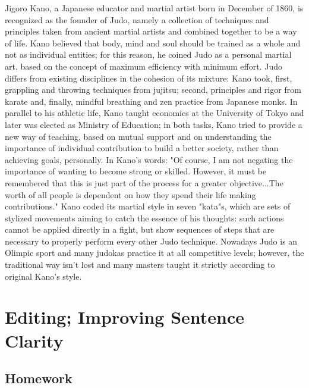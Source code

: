 \documentclass[a4paper,dottedtoc,headinclude,footinclude]{report} %
\theoremstyle{plain}
\begin{document}
    Jigoro Kano, a Japanese educator and martial artist born in
    December of 1860, is recognized as the founder of Judo, namely a
    collection of techniques and principles taken from ancient martial
    artists and combined together to be a way of life.  Kano believed that body,
    mind and soul should be trained as a whole and not as individual
    entities; for this reason, he coined Judo as a personal martial
    art, based on the concept of maximum efficiency with minimum
    effort.  Judo differs from existing disciplines in the cohesion of
    its mixture: Kano took, first, grappling and throwing techniques
    from jujitsu; second, principles and rigor from karate and,
    finally, mindful breathing and zen practice from Japanese
    monks. In parallel to his athletic life, Kano taught economics at
    the University of Tokyo and later was elected as Ministry of
    Education; in both tasks, Kano tried to provide a new way of
    teaching, based on mutual support and on understanding the
    importance of individual contribution to build a better society,
    rather than achieving goals, personally.  In Kano's words: "Of
    course, I am not negating the importance of wanting to become
    strong or skilled. However, it must be remembered that this is
    just part of the process for a greater objective...The worth of
    all people is dependent on how they spend their life making
    contributions."  Kano coded its martial style in seven "kata"s,
    which are sets of stylized movements aiming to catch the essence
    of his thoughts: such actions cannot be applied directly in a
    fight, but show sequences of steps that are necessary to properly
    perform every other Judo technique.  Nowadays Judo is an Olimpic
    sport and many judokas practice it at all competitive levels;
    however, the traditional way isn't lost and many masters taught it
    strictly according to original Kano's style.

    \chapter{Editing; Improving Sentence Clarity}
    
    \section{Homework}
    
\end{document}

